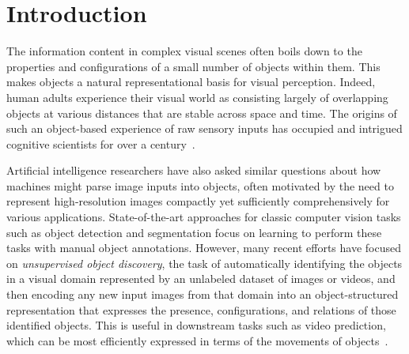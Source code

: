 \documentclass{article}
\newcommand{\jd}[1]{\textcolor{orange}{[DJ: #1]}}
\begin{document}
\section{Introduction}
\label{sec:intro}





The information content in complex visual scenes often boils down to the properties and configurations of a small number of objects within them. This makes objects a natural representational basis for visual perception. Indeed, human adults experience their visual world as consisting largely of overlapping objects at various distances that are stable across space and time. The origins of such an object-based experience of raw sensory inputs has occupied and intrigued cognitive scientists for over a century~\cite{wertheimer1912experimentelle, wertheimer1938laws, spelke1990principles, spelke1992origins, johnson2010infants, spelke2007core}.%

Artificial intelligence researchers have also asked similar questions about how machines might parse image inputs into objects, often motivated by the need to represent high-resolution images compactly yet sufficiently comprehensively for various applications. State-of-the-art approaches for classic computer vision tasks such as object detection and segmentation focus on learning to perform these tasks with manual object annotations. However, many recent efforts have focused on \emph{unsupervised object discovery}, the task of automatically identifying the objects in a visual domain represented by an unlabeled dataset of images or videos, and then encoding any new input images from that domain into an object-structured representation that expresses the presence, configurations, and relations of those identified objects. This is useful in downstream tasks such as video prediction, which can be most efficiently expressed in terms of the movements of objects~\cite{minderer2019unsupervised, Kulkarni2019UnsupervisedLO, kipf2019contrastive, lambeta2020digit}.

\end{document}
